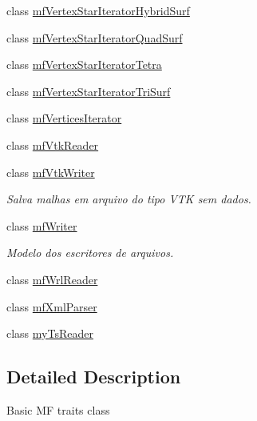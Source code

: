\begin{DoxyCompactItemize}
class \hyperlink{classmf_1_1mfVertexStarIteratorHybridSurf}{mfVertexStarIteratorHybridSurf}
\item 
class \hyperlink{classmf_1_1mfVertexStarIteratorQuadSurf}{mfVertexStarIteratorQuadSurf}
\item 
class \hyperlink{classmf_1_1mfVertexStarIteratorTetra}{mfVertexStarIteratorTetra}
\item 
class \hyperlink{classmf_1_1mfVertexStarIteratorTriSurf}{mfVertexStarIteratorTriSurf}
\item 
class \hyperlink{classmf_1_1mfVerticesIterator}{mfVerticesIterator}
\item 
class \hyperlink{classmf_1_1mfVtkReader}{mfVtkReader}
\item 
class \hyperlink{classmf_1_1mfVtkWriter}{mfVtkWriter}
\begin{DoxyCompactList}\small\item\em Salva malhas em arquivo do tipo VTK sem dados. \item\end{DoxyCompactList}\item 
class \hyperlink{classmf_1_1mfWriter}{mfWriter}
\begin{DoxyCompactList}\small\item\em Modelo dos escritores de arquivos. \item\end{DoxyCompactList}\item 
class \hyperlink{classmf_1_1mfWrlReader}{mfWrlReader}
\item 
class \hyperlink{classmf_1_1mfXmlParser}{mfXmlParser}
\item 
class \hyperlink{classmf_1_1myTsReader}{myTsReader}
\end{DoxyCompactItemize}


\subsection{Detailed Description}
Basic MF traits class 